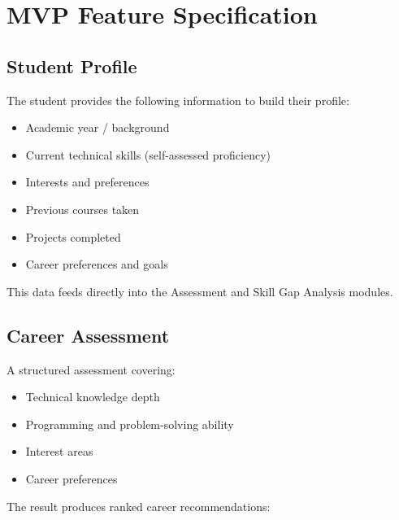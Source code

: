 \documentclass[12pt,a4paper]{article}
\begin{document}
\section{MVP Feature Specification}

\subsection{Student Profile}
\label{sec:mvp-profile}

The student provides the following information to build their profile:

\begin{itemize}[leftmargin=1.5cm]
  \item Academic year / background
  \item Current technical skills (self-assessed proficiency)
  \item Interests and preferences
  \item Previous courses taken
  \item Projects completed
  \item Career preferences and goals
\end{itemize}

\noindent This data feeds directly into the Assessment and Skill Gap Analysis modules.

\subsection{Career Assessment}
\label{sec:mvp-assessment}

A structured assessment covering:

\begin{itemize}[leftmargin=1.5cm]
  \item Technical knowledge depth
  \item Programming and problem-solving ability
  \item Interest areas
  \item Career preferences
\end{itemize}

\noindent The result produces ranked career recommendations:
\end{document}

